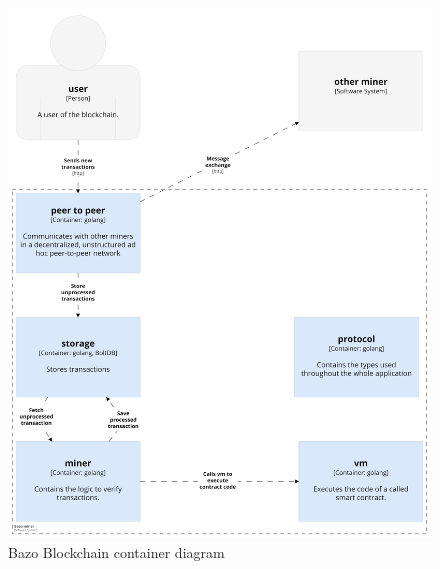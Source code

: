 \begin{figure}[H]
	\begin{center}
	\includegraphics[width=\textwidth]{./images/BAZO_Container}
	\caption{Bazo Blockchain container diagram}
	\label{systemcontainerdiagram}
	\end{center}
\end{figure}
\pagebreak

